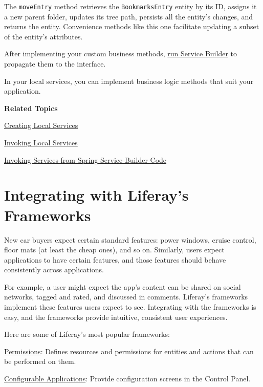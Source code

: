 The \texttt{moveEntry} method retrieves the \texttt{BookmarksEntry}
entity by its ID, assigns it a new parent folder, updates its tree path,
persists all the entity's changes, and returns the entity. Convenience
methods like this one facilitate updating a subset of the entity's
attributes.

After implementing your custom business methods,
\href{/docs/7-2/appdev/-/knowledge_base/a/running-service-builder}{run
Service Builder} to propagate them to the interface.

In your local services, you can implement business logic methods that
suit your application.

\textbf{Related Topics}

\href{/docs/7-2/appdev/-/knowledge_base/a/business-logic-with-service-builder}{Creating
Local Services}

\href{/docs/7-2/appdev/-/knowledge_base/a/invoking-local-services}{Invoking
Local Services}

\href{/docs/7-2/appdev/-/knowledge_base/a/invoking-services-from-spring-service-builder-code}{Invoking
Services from Spring Service Builder Code}

\chapter{Integrating with Liferay's
Frameworks}\label{integrating-with-liferays-frameworks}

New car buyers expect certain standard features: power windows, cruise
control, floor mats (at least the cheap ones), and so on. Similarly,
users expect applications to have certain features, and those features
should behave consistently across applications.

For example, a user might expect the app's content can be shared on
social networks, tagged and rated, and discussed in comments. Liferay's
frameworks implement these features users expect to see. Integrating
with the frameworks is easy, and the frameworks provide intuitive,
consistent user experiences.

Here are some of Liferay's most popular frameworks:

\href{/docs/7-2/frameworks/-/knowledge_base/f/defining-application-permissions}{Permissions}:
Defines resources and permissions for entities and actions that can be
performed on them.

\href{/docs/7-2/frameworks/-/knowledge_base/f/configurable-applications}{Configurable
Applications}: Provide configuration screens in the Control Panel.

